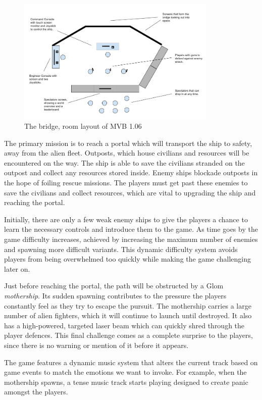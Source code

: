 \documentclass[a4paper,11pt]{article}
\begin{document}
\begin{figure}[ht]
	\centering
    \includegraphics[width=0.85\textwidth]{Room}
    \caption{The bridge, room layout of MVB 1.06}
    \label{fig:room_layout}
\end{figure}

The primary mission is to reach a portal which will transport the ship to safety, away from the alien fleet. Outposts, which house civilians and resources will be encountered on the way. The ship is able to save the civilians stranded on the outpost and collect any resources stored inside. Enemy ships blockade outposts in the hope of foiling rescue missions. The players must get past these enemies to save the civilians and collect resources, which are vital to upgrading the ship and reaching the portal.

Initially, there are only a few weak enemy ships to give the players a chance to learn the necessary controls and introduce them to the game. As time goes by the game difficulty increases, achieved by increasing the maximum number of enemies and spawning more difficult variants. This dynamic difficulty system avoids players from being overwhelmed too quickly while making the game challenging later on.

Just before reaching the portal, the path will be obstructed by a Glom \emph{mothership}. Its sudden spawning contributes to the pressure the players constantly feel as they try to escape the pursuit. The mothership carries a large number of alien fighters, which it will continue to launch until destroyed. It also has a high-powered, targeted laser beam which can quickly shred through the player defences. This final challenge comes as a complete surprise to the players, since there is no warning or mention of it before it appears.

The game features a dynamic music system that alters the current track based on game events to match the emotions we want to invoke. For example, when the mothership spawns, a tense music track starts playing designed to create panic amongst the players.
\end{document}
